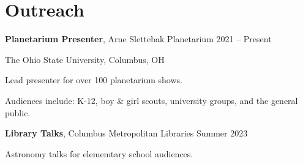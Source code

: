 \section*{Outreach}

{\bf Planetarium Presenter}, Arne Slettebak Planetarium 
\hfill 2021 -- Present

The Ohio State University, Columbus, OH

Lead presenter for over 100 planetarium shows.

Audiences include: K-12, boy \& girl scouts, university groups, and the general public.

\vspace{12pt}
\noindent
{\bf Library Talks}, Columbus Metropolitan Libraries
\hfill Summer 2023

Astronomy talks for elememtary school audiences.